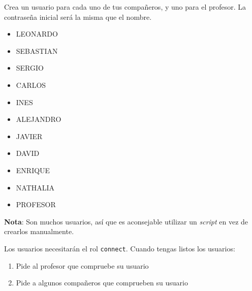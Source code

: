 \begin{homeworkProblem}

  Crea un usuario para cada uno de tus compañeros, y uno para el profesor. La contraseña inicial será la misma que el nombre.
  \begin{itemize}
  \item LEONARDO
  \item SEBASTIAN
  \item SERGIO
  \item CARLOS
  \item INES
  \item ALEJANDRO
  \item JAVIER
  \item DAVID
  \item ENRIQUE
  \item NATHALIA
  \item PROFESOR  
  \end{itemize}
  
  {\small \textbf{Nota}: Son muchos usuarios, así que es aconsejable utilizar un \textit{script} en vez de crearlos manualmente.}

  Los usuarios necesitarán el rol \texttt{connect}. Cuando tengas listos los usuarios:
  \begin{enumerate}
  \item Pide al profesor que compruebe su usuario
  \item Pide a algunos compañeros que comprueben su usuario
  \end{enumerate}
\end{homeworkProblem}


